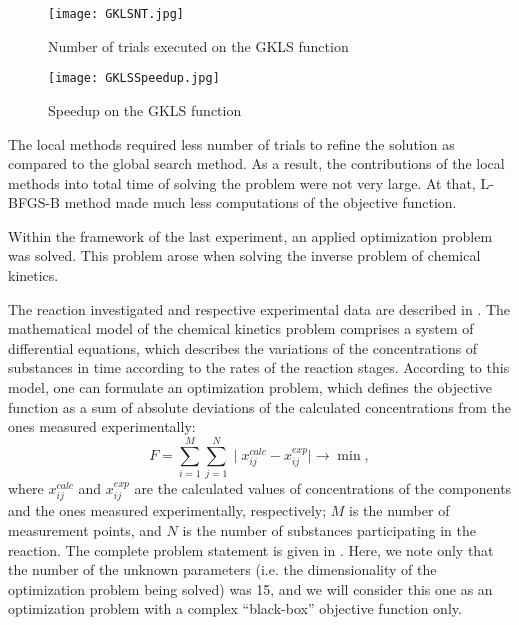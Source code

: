 \documentclass[runningheads]{llncs}
\begin{document}


\begin{figure}
\begin{center}
  \texttt{[image: GKLSNT.jpg]}
  \caption{Number of trials executed on the GKLS function}
  \label{fig:GKLSNT}  
\end{center}
\end{figure}

\begin{figure}
\begin{center}
  \texttt{[image: GKLSSpeedup.jpg]}
  \caption{Speedup on the GKLS function}
  \label{fig:GKLSSpeedup}  
\end{center}
\end{figure}


The local methods required less number of trials to refine the solution as compared to the global search method. As a result, the contributions of the local methods into total time of solving the problem were not very large. At that, L-BFGS-B method made much less computations of the objective function.

Within the framework of the last experiment, an applied optimization problem was solved. This problem arose when solving the inverse problem of chemical kinetics.

The reaction investigated and respective experimental data are described in \cite{Uskov2020}. The mathematical model of the chemical kinetics problem comprises a system of differential equations, which describes the variations of the concentrations of substances in time according to the rates of the reaction stages. According to this model, one can formulate an optimization problem, which defines the objective function as a sum of absolute deviations of the calculated concentrations from the ones measured experimentally:
\[
F = \sum_{i=1}^{M} \sum_{j=1}^{N} \mid x_{ij}^{calc} - x_{ij}^{exp}\mid \rightarrow \min,
\]
where $x_{ij}^{calc}$ and $x_{ij}^{exp}$ are the calculated values of concentrations of the components and the ones measured experimentally, respectively; $M$ is the number of measurement points, and $N$ is the number of substances participating in the reaction. The complete problem statement is given in \cite{PAVT}. Here, we note only that the number of the unknown parameters (i.e. the dimensionality of the optimization problem being solved) was 15, and we will consider this one as an optimization problem with a complex ``black-box'' objective function only.
\end{document}
